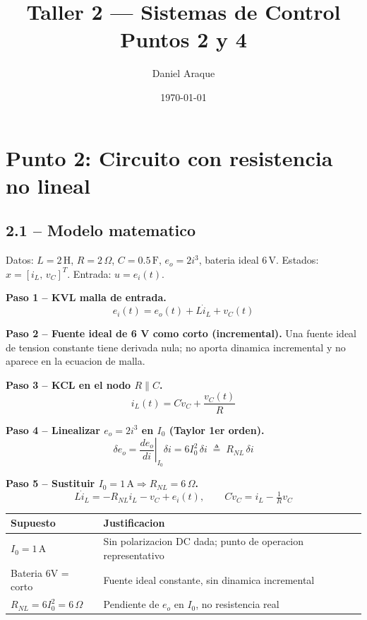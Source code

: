 \documentclass[11pt]{article}
\title{Taller 2 --- Sistemas de Control\\ Puntos 2 y 4}
\author{Daniel Araque}
\date{\today}
\begin{document}
\maketitle
\tableofcontents

\section{Punto 2: Circuito con resistencia no lineal}

\subsection{2.1 -- Modelo matematico}

Datos: $L=2\,\mathrm H$, $R=2\,\Omega$, $C=0.5\,\mathrm F$, $e_o=2i^3$, bateria ideal $6\,\mathrm V$.
Estados: $x=[i_L,\,v_C]^T$. Entrada: $u=e_i(t)$.

\textbf{Paso 1 -- KVL malla de entrada.}
\begin{equation}
e_i(t) = e_o(t) + L\dot i_L + v_C(t)
\end{equation}

\textbf{Paso 2 -- Fuente ideal de 6 V como corto (incremental).}
Una fuente ideal de tension constante tiene derivada nula; no aporta dinamica
incremental y no aparece en la ecuacion de malla.

\textbf{Paso 3 -- KCL en el nodo $R\|C$.}
\begin{equation}
i_L(t) = C\dot v_C + \frac{v_C(t)}{R}
\end{equation}

\textbf{Paso 4 -- Linealizar $e_o=2i^3$ en $I_0$ (Taylor 1er orden).}
\begin{equation}
\delta e_o = \left.\frac{de_o}{di}\right|_{I_0}\delta i = 6I_0^2\,\delta i
\;\triangleq\; R_{NL}\,\delta i
\end{equation}

\textbf{Paso 5 -- Sustituir $I_0=1\,\mathrm A \Rightarrow R_{NL}=6\,\Omega$.}
\begin{equation}
L\dot i_L = -R_{NL}i_L - v_C + e_i(t), \qquad
C\dot v_C = i_L - \tfrac1R v_C
\end{equation}

\begin{center}
\begin{tabular}{@{}ll@{}}
\toprule
Supuesto & Justificacion \\
\midrule
$I_0=1\,\mathrm A$ & Sin polarizacion DC dada; punto de operacion representativo \\
Bateria $6$V = corto & Fuente ideal constante, sin dinamica incremental \\
$R_{NL}=6I_0^2=6\,\Omega$ & Pendiente de $e_o$ en $I_0$, no resistencia real \\
\bottomrule
\end{tabular}
\end{center}
\end{document}
